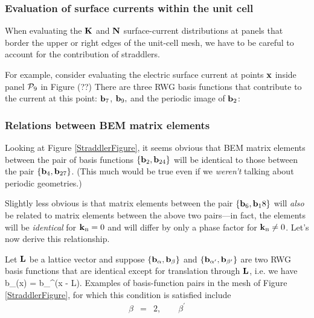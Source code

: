 \subsubsection{Evaluation of surface currents within the unit cell}

When evaluating the $\mathbf{K}$ and $\mathbf{N}$ surface-current 
distributions at panels that border the upper or right edges 
of the unit-cell mesh, we have to be careful to account for the 
contribution of straddlers. 

For example, consider evaluating the electric surface current at 
points $\mathbf{x}$ inside panel $\mathcal{P}_9$ in Figure (??) %
There are three RWG basis functions that contribute to the current
at this point: $\mathbf{b}_7$, $\mathbf{b}_9,$ and the periodic image of 
$\mathbf{b}_2$:

\subsubsection{Relations between BEM matrix elements}

Looking at Figure \ref{StraddlerFigure}, it seems 
obvious that BEM matrix elements between the pair of 
basis functions
$\{\mathbf{b}_2, \mathbf{b}_{24}\}$ will be identical to those
between the pair 
$\{\mathbf{b}_4, \mathbf{b}_{27}\}$. (This much would be 
true even if we \textit{weren't} talking about
periodic geometries.)

Slightly less obvious is that matrix elements between
the pair $\{\mathbf{b}_6, \mathbf{b}_18\}$ will \textit{also}
be related to matrix elements between the above two
pairs---in fact, the elements will be \textit{identical}
for $\mathbf{k}_{\hbox{\tiny{B}}}=0$ and will differ by only a phase factor
for $\mathbf{k}_{\hbox{\tiny{B}}}\ne 0$. Let's now derive this relationship.

Let $\mathbf{L}$ be a lattice vector and suppose
$\{\mathbf{b}_\alpha, \mathbf{b}_\beta\}$ and
$\{\mathbf{b}_{\alpha^\prime}, \mathbf{b}_{\beta^\prime}\}$
are two RWG basis functions that are identical except 
for translation through $\mathbf{L}$, i.e. we have
 { \vb b_\beta(\vb x) = \vb b_\beta^\prime(\vb x - \vb L).
 }
Examples of basis-function pairs in the mesh of Figure 
\ref{StraddlerFigure}, for which this condition is satisfied 
include
$$\begin{array}{lclclcl}
  \beta&=&2, \qquad \beta^\prime
  \end{array}
$$

\begin{align*}
\end{align*}

%
